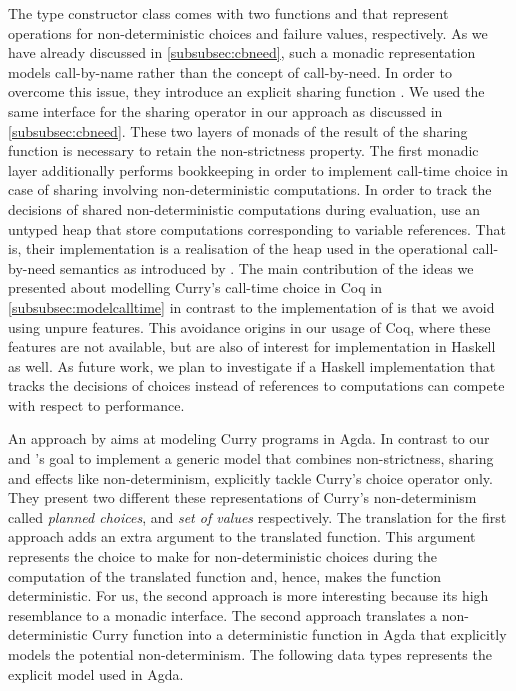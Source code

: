 The type constructor class  comes with two functions  and  that represent operations for non-deterministic choices and failure values, respectively.
As we have already discussed in \autoref{subsubsec:cbneed}, such a monadic representation models call-by-name rather than the  concept of call-by-need.
In order to overcome this issue, they introduce an explicit sharing function .
We used the same interface for the sharing operator in our approach as discussed in \autoref{subsubsec:cbneed}.
These two layers of monads of the result of the sharing function is necessary to retain the non-strictness property.
The first monadic layer additionally performs bookkeeping in order to implement call-time choice in case of sharing involving non-deterministic computations.
In order to track the decisions of shared non-deterministic computations during evaluation, \citeauthor{fischer2009purely} use an untyped heap that store computations corresponding to variable references.
That is, their implementation is a realisation of the heap used in the operational call-by-need semantics as introduced by \citet{launchbury1993natural}.
The main contribution of the ideas we presented about modelling Curry's call-time choice in Coq in \autoref{subsubsec:modelcalltime} in contrast to the implementation of \citeauthor{fischer2009purely} is that we avoid using unpure features.
This avoidance origins in our usage of Coq, where these features are not available, but are also of interest for implementation in Haskell as well.
As future work, we plan to investigate if a Haskell implementation that tracks the decisions of choices instead of references to computations can compete with respect to performance.

An approach by \citet{antoy2017proving} aims at modeling Curry programs in Agda.
In contrast to our and \citeauthor{fischer2009purely}'s goal to implement a generic model that combines non-strictness, sharing and effects like non-determinism, \citeauthor{antoy2017proving} explicitly tackle Curry's choice operator only.
They present two different these representations of Curry's non-determinism called \emph{planned choices}, and \emph{set of values} respectively.
The translation for the first approach adds an extra argument to the translated function.
This argument represents the choice to make for non-deterministic choices during the computation of the translated function and, hence, makes the function deterministic.
For us, the second approach is more interesting because its high resemblance to a monadic interface.
The second approach translates a non-deterministic Curry function into a deterministic function in Agda that explicitly models the potential non-determinism.
The following data types represents the explicit model used in Agda.

